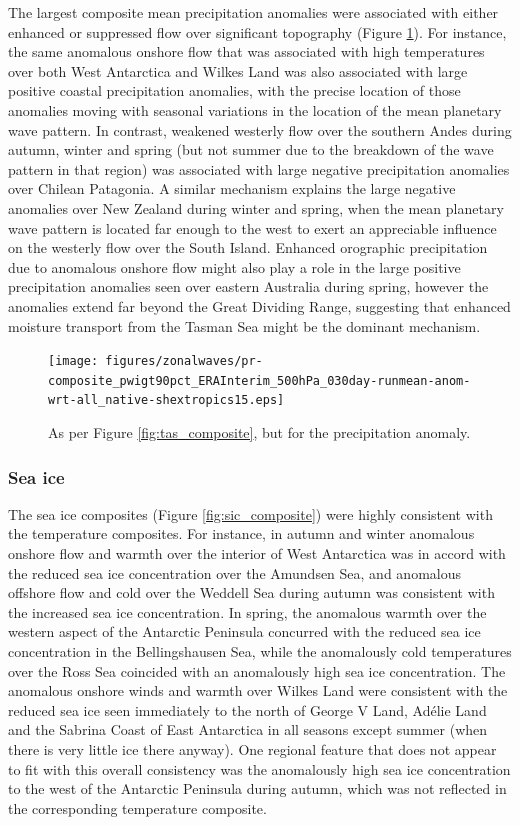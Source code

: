 The largest composite mean precipitation anomalies were associated with either enhanced or suppressed flow over significant topography (Figure \ref{fig:pr_composite}). For instance, the same anomalous onshore flow that was associated with high temperatures over both West Antarctica and Wilkes Land was also associated with large positive coastal precipitation anomalies, with the precise location of those anomalies moving with seasonal variations in the location of the mean planetary wave pattern. In contrast, weakened westerly flow over the southern Andes during autumn, winter and spring (but not summer due to the breakdown of the wave pattern in that region) was associated with large negative precipitation anomalies over Chilean Patagonia. A similar mechanism explains the large negative anomalies over New Zealand during winter and spring, when the mean planetary wave pattern is located far enough to the west to exert an appreciable influence on the westerly flow over the South Island. Enhanced orographic precipitation due to anomalous onshore flow might also play a role in the large positive precipitation anomalies seen over eastern Australia during spring, however the anomalies extend far beyond the Great Dividing Range, suggesting that enhanced moisture transport from the Tasman Sea might be the dominant mechanism. 

\begin{figure}
\begin{center}
\texttt{[image: figures/zonalwaves/pr-composite\_pwigt90pct\_ERAInterim\_500hPa\_030day-runmean-anom-wrt-all\_native-shextropics15.eps]}
\caption{\label{fig:pr_composite}
As per Figure \ref{fig:tas_composite}, but for the precipitation anomaly.}
\end{center}
\end{figure}


\subsubsection{Sea ice}

The sea ice composites (Figure \ref{fig:sic_composite}) were highly consistent with the temperature composites. For instance, in autumn and winter anomalous onshore flow and warmth over the interior of West Antarctica was in accord with the reduced sea ice concentration over the Amundsen Sea, and anomalous offshore flow and cold over the Weddell Sea during autumn was consistent with the increased sea ice concentration. In spring, the anomalous warmth over the western aspect of the Antarctic Peninsula concurred with the reduced sea ice concentration in the Bellingshausen Sea, while the anomalously cold temperatures over the Ross Sea coincided with an anomalously high sea ice concentration. The anomalous onshore winds and warmth over Wilkes Land were consistent with the reduced sea ice seen immediately to the north of George V Land, Ad{\'e}lie Land and the Sabrina Coast of East Antarctica in all seasons except summer (when there is very little ice there anyway). One regional feature that does not appear to fit with this overall consistency was the anomalously high sea ice concentration to the west of the Antarctic Peninsula during autumn, which was not reflected in the corresponding temperature composite.
 
